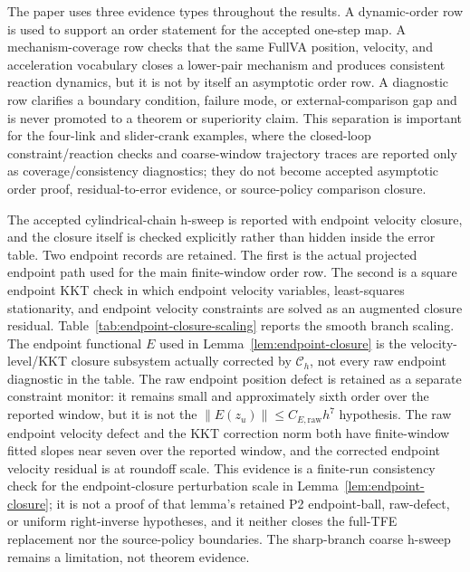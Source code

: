 \documentclass[preprint,12pt]{elsarticle}
\newcommand{\tfe}{TFE}
\begin{document}
The paper uses three evidence types throughout the results. A dynamic-order row
is used to support an order statement for the accepted one-step map. A
mechanism-coverage row checks that the same FullVA position, velocity, and
acceleration vocabulary closes a lower-pair mechanism and produces consistent
reaction dynamics, but it is not by itself an asymptotic order row. A diagnostic
row clarifies a boundary condition, failure mode, or external-comparison gap and
is never promoted to a theorem or superiority claim. This separation is
important for the four-link and slider-crank examples, where the closed-loop
constraint/reaction checks and coarse-window trajectory traces are reported
only as coverage/consistency diagnostics; they do not become accepted
asymptotic order proof, residual-to-error evidence, or source-policy
comparison closure.

The accepted cylindrical-chain h-sweep is reported with endpoint velocity
closure, and the closure itself is checked explicitly rather than hidden inside the error
table. Two endpoint records are retained. The first is the actual projected
endpoint path used for the main finite-window order row. The second is a
square endpoint KKT check in which endpoint velocity variables, least-squares
stationarity, and endpoint velocity constraints are solved as an augmented
closure residual. Table~\ref{tab:endpoint-closure-scaling} reports the smooth
branch scaling. The endpoint functional \(E\) used in
Lemma~\ref{lem:endpoint-closure} is the velocity-level/KKT closure subsystem
actually corrected by \(\mathcal C_h\), not every raw endpoint diagnostic in
the table. The raw endpoint position defect is retained as a separate
constraint monitor: it remains small and approximately sixth order over the
reported window, but it is not the \(\|E(z_u)\|\le C_{E,\mathrm{raw}}h^7\)
hypothesis. The raw endpoint velocity defect and the KKT correction norm both
have finite-window fitted slopes near seven over the reported window, and the
corrected endpoint velocity residual is at roundoff scale. This evidence is a
finite-run consistency check for the endpoint-closure perturbation scale in
Lemma~\ref{lem:endpoint-closure}; it is not a proof of that lemma's retained
P2 endpoint-ball, raw-defect, or uniform right-inverse hypotheses, and it
neither closes the full-\tfe{} replacement nor the source-policy boundaries.
The sharp-branch coarse h-sweep remains a limitation, not theorem evidence.
\end{document}
